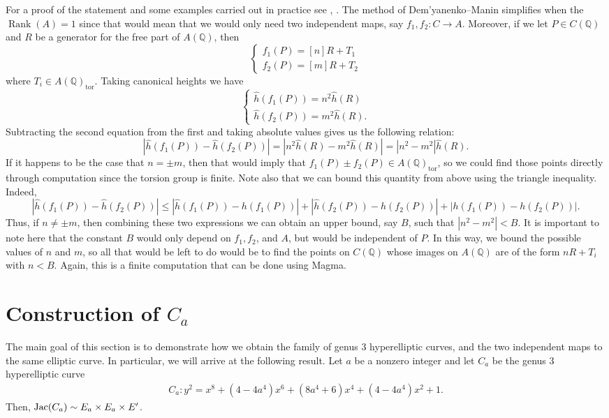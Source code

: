 \documentclass{article}
\newenvironment{manualtheorem}[1]{%
  \IfBlankTF{#1}
    {\renewcommand{\themanualtheoreminner}{\unskip}}
    {\renewcommand\themanualtheoreminner{#1}}%
  \manualtheoreminner
}{\endmanualtheoreminner}
\newcommand{\Q}{\mathbb{Q}}
\theoremstyle{definition}
\newcommand{\Jac}{\textnormal{Jac}}
\DeclareMathOperator{\Rank}{Rank}
\begin{document}
\noindent For a proof of the statement and some examples carried out in practice see \cite{girard2005computation}, \cite{kulesz1999application}. The method of Dem'yanenko--Manin simplifies when the $\Rank(A) = 1$ since that would mean that we would only need two independent maps, say $f_1, f_2 \colon C \to A$. Moreover, if we let $P \in C(\Q)$ and $R$ be a generator for the free part of $A(\Q)$, then
$$\begin{cases}
    f_1(P) = [n]R + T_1 \\
    f_2(P) = [m]R + T_2
\end{cases}$$
where $T_i \in A(\Q)_{\text{tor}}$. Taking canonical heights we have
$$\begin{cases}
    \hat{h}(f_1(P)) = n^2\hat{h}(R) \\
    \hat{h}(f_2(P)) = m^2\hat{h}(R).
\end{cases}$$
Subtracting the second equation from the first and taking absolute values gives us the following relation:
$$ \left|\hat{h}(f_1(P)) - \hat{h}(f_2(P))\right| = \left|n^2\hat{h}(R) - m^2\hat{h}(R)\right| = \left|n^2 - m^2\right| \hat{h}(R). $$
If it happens to be the case that $n = \pm m$, then that would imply that $f_1(P) \pm f_2(P) \in A(\Q)_{\text{tor}}$, so we could find those points directly through computation since the torsion group is finite. Note also that we can bound this quantity from above using the triangle inequality. Indeed,
$$ \left|\hat{h}(f_1(P)) - \hat{h}(f_2(P))\right| \leq \left|\hat{h}(f_1(P)) - h(f_1(P))\right| + \left|\hat{h}(f_2(P)) - h(f_2(P))\right| + \Big|h(f_1(P)) - h(f_2(P))\Big|.$$
Thus, if $n \neq \pm m$, then combining these two expressions we can obtain an upper bound, say $B$, such that $|n^2 - m^2| < B$. It is important to note here that the constant $B$ would only depend on $f_1, f_2$, and $A$, but would be independent of $P$. In this way, we bound the possible values of $n$ and $m$, so all that would be left to do would be to find the points on $C(\Q)$ whose images on $A(\Q)$ are of the form $nR + T_i$ with $n < B$. Again, this is a finite computation that can be done using Magma.

\section{Construction of $C_a$}
The main goal of this section is to demonstrate how we obtain the family of genus 3 hyperelliptic curves, and the two independent maps to the same elliptic curve. In particular, we will arrive at the following result.
\begin{manualtheorem}{3.2}\label{3.2}
    Let $a$ be a nonzero integer and let $C_a$ be the genus 3 hyperelliptic curve
\begin{eqnarray*}
    C_a \colon y^2 = x^8 + (4-4a^4)x^6 + (8a^4 + 6)x^4 + (4-4a^4)x^2 + 1.
\end{eqnarray*}
Then, $\Jac(C_a) \sim E_a \times E_a \times E'$.
\end{manualtheorem}
\end{document}
